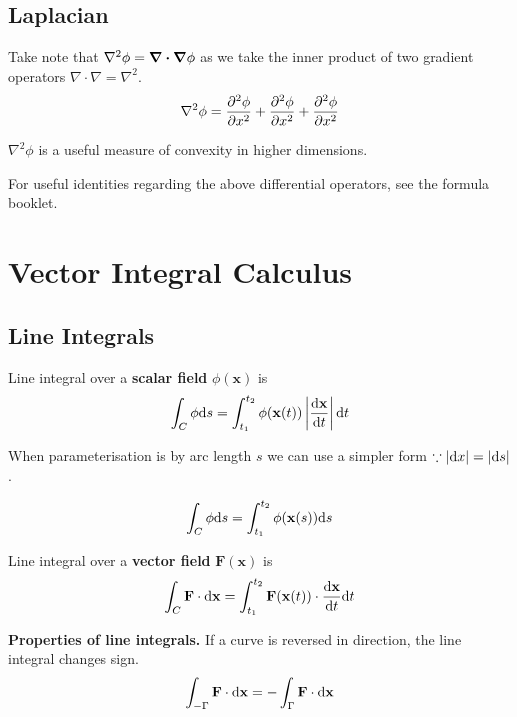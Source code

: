 \subsection*{Laplacian}
Take note that $\nabla^2 \phi = \divergence \grad \phi$ as we take the inner product of two gradient operators $\nabla \cdot \nabla = \nabla^2$.
\begin{equation*}
    \nabla^2 \phi =  \pdv[2]{\phi}{x} + \pdv[2]{\phi}{x} + \pdv[2]{\phi}{x}
\end{equation*}

$\nabla^2 \phi$ is a useful measure of convexity in higher dimensions.
\vspace{\baselineskip}

For useful identities regarding the above differential operators, see the formula booklet.

\section{Vector Integral Calculus}

\subsection*{Line Integrals}
Line integral over a \textbf{scalar field} $\phi(\mathbf{x})$ is
\begin{equation*}
    \int_C \phi \differential s = \int_{t_1}^{t_2} \phi(\mathbf{x}(t)) \left\lvert \dv{\mathbf{x}}{t} \right\rvert \differential t
\end{equation*}

When parameterisation is by arc length $s$ we can use a simpler form $\because |\differential x| = |\differential s|$.

\begin{equation*}
    \int_C \phi \differential s = \int_{t_1}^{t_2} \phi(\mathbf{x}(s)) \differential s
\end{equation*}

Line integral over a \textbf{vector field} $\mathbf{F}(\mathbf{x})$ is
\begin{equation*}
    \int_C \mathbf{F} \cdot \differential \mathbf{x} = \int_{t_1}^{t_2} \mathbf{F}(\mathbf{x}(t))\cdot \dv{\mathbf{x}}{t}\differential t
\end{equation*}

\textbf{Properties of line integrals.} If a curve is reversed in direction, the line integral changes sign.
\begin{equation*}
    \int_{- \Gamma} \mathbf{F} \cdot \differential \mathbf{x} = - \int_{\Gamma} \mathbf{F} \cdot \differential \mathbf{x}
\end{equation*}

